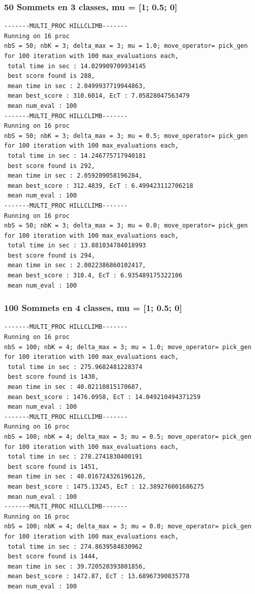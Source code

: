 \documentclass[a4paper]{article}
\begin{document}
\subsubsection{50 Sommets en 3 classes, mu = [1; 0.5; 0]}
\begin{verbatim}
-------MULTI_PROC HILLCLIMB-------
Running on 16 proc
nbS = 50; nbK = 3; delta_max = 3; mu = 1.0; move_operator= pick_gen
for 100 iteration with 100 max_evaluations each, 
 total time in sec : 14.029909709934145
 best score found is 288,
 mean time in sec : 2.0499937719944863,
 mean best_score : 310.6014, EcT : 7.05828047563479
 mean num_eval : 100
-------MULTI_PROC HILLCLIMB-------
Running on 16 proc
nbS = 50; nbK = 3; delta_max = 3; mu = 0.5; move_operator= pick_gen
for 100 iteration with 100 max_evaluations each, 
 total time in sec : 14.246775717940181
 best score found is 292,
 mean time in sec : 2.059209058196284,
 mean best_score : 312.4839, EcT : 6.499423112706218
 mean num_eval : 100
-------MULTI_PROC HILLCLIMB-------
Running on 16 proc
nbS = 50; nbK = 3; delta_max = 3; mu = 0.0; move_operator= pick_gen
for 100 iteration with 100 max_evaluations each, 
 total time in sec : 13.881034784018993
 best score found is 294,
 mean time in sec : 2.0022386860102417,
 mean best_score : 310.4, EcT : 6.935489175322106
 mean num_eval : 100
\end{verbatim}
\subsubsection{100 Sommets en 4 classes, mu = [1; 0.5; 0]}
\begin{verbatim}
-------MULTI_PROC HILLCLIMB-------
Running on 16 proc
nbS = 100; nbK = 4; delta_max = 3; mu = 1.0; move_operator= pick_gen
for 100 iteration with 100 max_evaluations each, 
 total time in sec : 275.9682481228374
 best score found is 1430,
 mean time in sec : 40.02110815170687,
 mean best_score : 1476.0958, EcT : 14.049210494371259
 mean num_eval : 100
-------MULTI_PROC HILLCLIMB-------
Running on 16 proc
nbS = 100; nbK = 4; delta_max = 3; mu = 0.5; move_operator= pick_gen
for 100 iteration with 100 max_evaluations each, 
 total time in sec : 278.2741830400191
 best score found is 1451,
 mean time in sec : 40.016724326196126,
 mean best_score : 1475.13245, EcT : 12.389276001686275
 mean num_eval : 100
-------MULTI_PROC HILLCLIMB-------
Running on 16 proc
nbS = 100; nbK = 4; delta_max = 3; mu = 0.0; move_operator= pick_gen
for 100 iteration with 100 max_evaluations each, 
 total time in sec : 274.8639584830962
 best score found is 1444,
 mean time in sec : 39.720520393801856,
 mean best_score : 1472.87, EcT : 13.68967390835778
 mean num_eval : 100
\end{verbatim}
\end{document}

